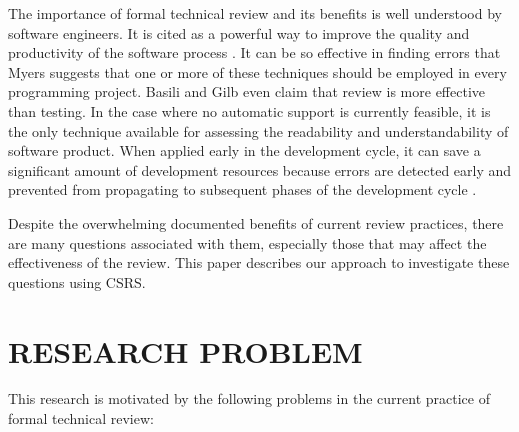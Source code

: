 The importance of formal technical review and its benefits is well
understood by software engineers.  It is cited as a powerful way to
improve the quality and productivity of the software process
\cite{Humphrey90,Freedman90}. It can be so effective in finding errors
that Myers \cite{Myers79} suggests that one or more of these
techniques should be employed in every programming project.
Basili\cite{Basili85} and Gilb\cite{Gilb88} even claim that review is
more effective than testing.  In the case where no automatic support
is currently feasible, it is the only technique available for
assessing the readability and understandability of software product.
When applied early in the development cycle, it can save a significant
amount of development resources because errors are detected early and
prevented from propagating to subsequent phases of the development
cycle \cite{Fagan76}.

Despite the overwhelming documented benefits of current review
practices, there are many questions associated with them, especially
those that may affect the effectiveness of the review.
This paper describes our approach to investigate these questions
using CSRS. 


\section {RESEARCH PROBLEM}
This research is motivated by the following problems in the
current practice of formal technical review:

